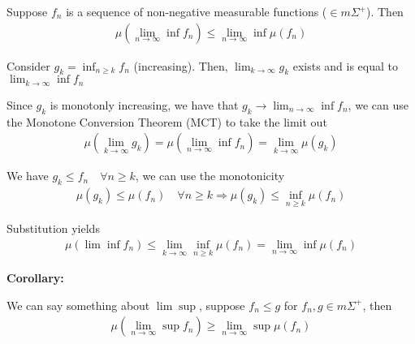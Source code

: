 \par\bigskip
\begin{lem}{}
  Suppose $f_n$ is a sequence of non-negative measurable functions ($\in m\Sigma^+$). Then
  \begin{equation*}
    \begin{gathered}
      \mu(\lim_{n\to\infty}\inf f_n) \leq \lim_{n\to\infty}\inf\mu(f_n)
    \end{gathered}
  \end{equation*}
\end{lem}
\par\bigskip
\begin{prf}[]{}
  Consider $g_k = \inf_{n\geq k} f_n$ (increasing). Then, $\lim_{k\to\infty} g_k$ exists and is equal to $\lim_{k\to\infty}\inf f_n$\par
  \noindent Since $g_k$ is monotonly increasing, we have that $g_k\to\lim_{n\to\infty}\inf f_n$, we can use the Monotone Conversion Theorem (MCT) to take the limit out
  \begin{equation*}
    \begin{gathered}
      \mu(\lim_{k\to\infty}g_k) = \mu(\lim_{n\to\infty}\inf f_n) = \lim_{k\to\infty}\mu(g_k)
    \end{gathered}
  \end{equation*}\par
  \noindent We have $g_k\leq f_n\quad\forall n\geq k$, we can use the monotonicity
  \begin{equation*}
    \begin{gathered}
      \mu(g_k)\leq \mu(f_n)\quad\forall n\geq k \Rightarrow \mu(g_k)\leq \inf_{n\geq k}\mu(f_n)
    \end{gathered}
  \end{equation*}\par
  \noindent Substitution yields
  \begin{equation*}
    \begin{gathered}
      \mu(\lim\inf f_n)\leq \lim_{k\to\infty}\inf_{n\geq k} \mu(f_n) = \lim_{n\to\infty}\inf\mu(f_n)
    \end{gathered}
  \end{equation*}
\end{prf}
\par\bigskip
\noindent\textbf{Corollary:}\par
\noindent We can say something about $\lim\sup$, suppose $f_n\leq g$ for $f_n,g\in m\Sigma^+$, then
\begin{equation*}
  \begin{gathered}
    \mu(\lim_{n\to\infty}\sup f_n)\geq \lim_{n\to\infty}\sup \mu(f_n)
  \end{gathered}
\end{equation*}
